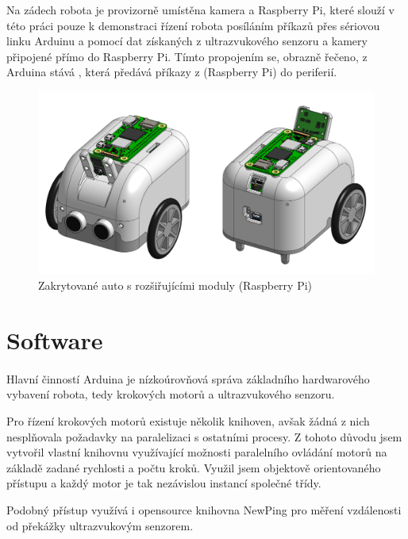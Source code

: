 \documentclass[12pt]{article}
\begin{document}
\begin{spacing}{1.5}
	Na zádech robota je provizorně umístěna kamera a Raspberry Pi, které slouží v této práci pouze k demonstraci řízení robota posíláním příkazů přes sériovou linku Arduinu a pomocí dat získaných z ultrazvukového senzoru a kamery připojené přímo do Raspberry Pi. Tímto propojením se, obrazně řečeno, z Arduina stává , která předává příkazy z  (Raspberry Pi) do periferií.
	
	\begin{figure}[H]
		\centering
		\includegraphics[width=\linewidth]{model_vse}
		\caption{Zakrytované auto s rozšiřujícími moduly (Raspberry Pi)}
		\label{fig:model_vse}
	\end{figure}
	
	\newpage
	\section{Software}
	
	\paragraph{}Hlavní činností Arduina je nízkoúrovňová správa základního hardwarového vybavení robota, tedy krokových motorů a ultrazvukového senzoru.
	
	Pro řízení krokových motorů existuje několik knihoven, avšak žádná z nich nesplňovala požadavky na paralelizaci s ostatními procesy. Z tohoto důvodu jsem vytvořil vlastní knihovnu využívající možnosti paralelního ovládání motorů na základě zadané rychlosti a počtu kroků. Využil jsem objektově orientovaného přístupu a každý motor je tak nezávislou instancí společné třídy.
	
	Podobný přístup využívá i opensource knihovna NewPing pro měření vzdálenosti od překážky ultrazvukovým senzorem. 
	

\end{spacing}
\end{document}
